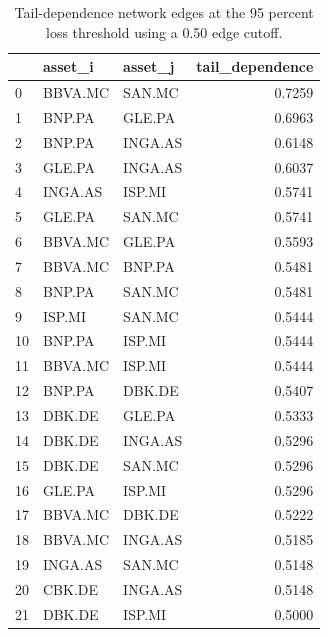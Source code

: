 \begin{table}
\caption{Tail-dependence network edges at the 95 percent loss threshold using a 0.50 edge cutoff.}
\label{tab:tail_dependence_network_edges_q95_threshold_050}
\begin{tabular}{lllr}
\toprule
 & asset_i & asset_j & tail_dependence \\
\midrule
0 & BBVA.MC & SAN.MC & 0.7259 \\
1 & BNP.PA & GLE.PA & 0.6963 \\
2 & BNP.PA & INGA.AS & 0.6148 \\
3 & GLE.PA & INGA.AS & 0.6037 \\
4 & INGA.AS & ISP.MI & 0.5741 \\
5 & GLE.PA & SAN.MC & 0.5741 \\
6 & BBVA.MC & GLE.PA & 0.5593 \\
7 & BBVA.MC & BNP.PA & 0.5481 \\
8 & BNP.PA & SAN.MC & 0.5481 \\
9 & ISP.MI & SAN.MC & 0.5444 \\
10 & BNP.PA & ISP.MI & 0.5444 \\
11 & BBVA.MC & ISP.MI & 0.5444 \\
12 & BNP.PA & DBK.DE & 0.5407 \\
13 & DBK.DE & GLE.PA & 0.5333 \\
14 & DBK.DE & INGA.AS & 0.5296 \\
15 & DBK.DE & SAN.MC & 0.5296 \\
16 & GLE.PA & ISP.MI & 0.5296 \\
17 & BBVA.MC & DBK.DE & 0.5222 \\
18 & BBVA.MC & INGA.AS & 0.5185 \\
19 & INGA.AS & SAN.MC & 0.5148 \\
20 & CBK.DE & INGA.AS & 0.5148 \\
21 & DBK.DE & ISP.MI & 0.5000 \\
\bottomrule
\end{tabular}
\end{table}
